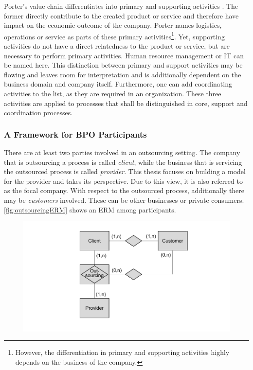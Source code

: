 	Porter's value chain differentiates into primary and supporting activities \citep{porter1985}. The former directly contribute to the created product or service and therefore have impact on the economic outcome of the company. Porter names logistics, operations or service as parts of these primary activities\footnote{However, the differentiation in primary and supporting activities highly depends on the business of the company.}. Yet, supporting activities do not have a direct relatedness to the product or service, but are necessary to perform primary activities. Human resource management or IT can be named here. This distinction between primary and support activities may be flowing and leaves room for interpretation and is additionally dependent on the business domain and company itself. Furthermore, one can add coordinating activities to the list, as they are required in an organization. These three activities are applied to processes that shall be distinguished in core, support and coordination processes. 
	 
		\subsubsection{A Framework for BPO Participants}
		\label{sec:frameworkbpo}
	There are at least two parties involved in an outsourcing setting. The company that is outsourcing a process is called \textit{client}, while the business that is servicing the outsourced process is called \textit{provider}. This thesis focuses on building a model for the provider and takes its perspective. Due to this view, it is also referred to as the focal company. With respect to the outsourced process, additionally there may be \textit{customers} involved. These can be other businesses or private consumers.  \Fig \ref{fig:outsourcingERM} shows an \acrfull{ERM} \citep{Chen:1976:ERM} among participants.
			\begin{figure}[caption={Outsourcing ERM}, label={fig:outsourcingERM}]
		{	\includegraphics[width=.8\textwidth]{figures/outsourcingERM.pdf}}
	\end{figure}
	

